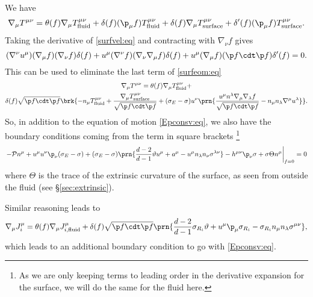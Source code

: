 \documentclass[12pt]{article}
\newcommand{\ploc}{\mathcal{P}}
\newcommand{\surf}{_\text{surface}}
\begin{document}
We have
%
\begin{equation}\label{surfeom:eq}
  \nabla_\mu T^{\mu\nu} = \theta(f)\nabla_\mu T^{\mu\nu}_\text{fluid} + \delta(f)(\p_\mu f) T^{\mu\nu}_\text{fluid} + \delta(f)\nabla_\mu T^{\mu\nu}\surf + \delta'(f)(\p_\mu f) T^{\mu\nu}\surf.
\end{equation}
%
Taking the derivative of \eqref{surfvel:eq} and contracting with $\nabla_\nu f$ gives
%
\begin{equation*}
  (\nabla^\nu u^\mu) (\nabla_\mu f) (\nabla_\nu f) \delta(f)
  + u^\mu (\nabla^\nu f) (\nabla_\nu \nabla_\mu f) \delta(f)
  + u^\mu (\nabla_\mu f) (\p f \cdt \p f) \delta'(f)
  = 0.
\end{equation*}
%
This can be used to eliminate the last term of \eqref{surfeom:eq}
%
\begin{multline}\label{surfeom2:eq}
  \nabla_\mu T^{\mu\nu} = \theta(f)\nabla_\mu T^{\mu\nu}_\text{fluid} +\\ \delta(f)\sqrt{\p f \cdt \p f}\brk{
  -n_\mu T^{\mu\nu}_\text{fluid} + \frac{\nabla_\mu T^{\mu\nu}\surf}{\sqrt{\p f \cdt \p f}}
  +(\sigma_E-\sigma)u^\nu\prn{\frac{u^\mu n^\lambda \nabla_\mu\nabla_\lambda f}{\sqrt{\p f \cdt \p f}} - n_\mu n_\lambda \nabla^\mu u^\lambda}
  }.
\end{multline}
%
So, in addition to the equation of motion \eqref{Epconsv:eq}, we also have the boundary conditions coming from the term in square brackets
\footnote{As we are only keeping terms to leading order in the derivative expansion for the surface, we will do the same for the fluid here.}
%
\begin{equation}\label{surfbc:eq}
  \left.
  -\ploc n^\mu + u^\mu u^\nu \p_\nu (\sigma_E-\sigma)
  +(\sigma_E-\sigma)\prn{ \frac{d-2}{d-1}\vartheta u^\mu  + a^\mu - u^\mu n_\lambda n_\nu \sigma^{\lambda\nu}}
  -h^{\mu\nu}\p_\nu\sigma + \sigma\Theta n^\mu
  \right\vert_{f=0} = 0
\end{equation}
%
where $\Theta$ is the trace of the extrinsic curvature of the surface, as seen from outside the fluid (see \S\ref{sec:extrinsic}).

Similar reasoning leads to
%
\begin{equation}\label{surfchbc:eq}
  \nabla_\mu J^\mu_i= \theta(f)\nabla_\mu J^\mu_{i,\text{fluid}}
   + \delta(f)\sqrt{\p f \cdt \p f} \prn{\frac{d-2}{d-1}\sigma_{R_i}\vartheta + u^\mu\p_\mu\sigma_{R_i} - \sigma_{R_i}n_\mu n_\lambda \sigma^{\mu\nu}},
\end{equation}
%
which leads to an additional boundary condition to go with \eqref{Epconsv:eq}.
\end{document}
